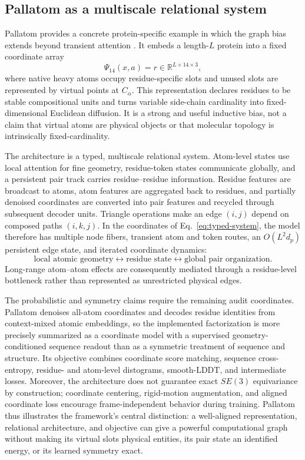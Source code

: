 \documentclass[10pt]{article}
\newcommand{\R}{\mathbb R}
\theoremstyle{definition}
\theoremstyle{remark}
\newcommand{\BookSection}[1]{\subsection{#1}}
\begin{document}
\ifdefined\BOOKMODE
\else
\BookSection{Pallatom as a multiscale relational system}

Pallatom provides a concrete protein-specific example in which the graph bias extends beyond
transient attention \cite{qu2025pallatom}.  It embeds a length-$L$ protein into a fixed coordinate
array
\begin{equation}
\Psi_{14}(x,a)=r\in\R^{L\times14\times3},
\label{eq:pallatom-atom14}
\end{equation}
where native heavy atoms occupy residue-specific slots and unused slots are represented by virtual
points at $C_\alpha$.  This representation declares residues to be stable compositional units and
turns variable side-chain cardinality into fixed-dimensional Euclidean diffusion.  It is a strong
and useful inductive bias, not a claim that virtual atoms are physical objects or that molecular
topology is intrinsically fixed-cardinality.

The architecture is a typed, multiscale relational system.  Atom-level states use local attention
for fine geometry, residue-token states communicate globally, and a persistent pair track carries
residue--residue information.  Residue features are broadcast to atoms, atom features are
aggregated back to residues, and partially denoised coordinates are converted into pair features
and recycled through subsequent decoder units.  Triangle operations make an edge $(i,j)$ depend on
composed paths $(i,k,j)$.  In the coordinates of Eq.~\ref{eq:typed-system}, the model therefore has
multiple node fibers, transient atom and token routes, an $O(L^2d_p)$ persistent edge state, and
iterated coordinate dynamics:
\begin{equation}
\text{local atomic geometry}
\longleftrightarrow
\text{residue state}
\longleftrightarrow
\text{global pair organization}.
\label{eq:pallatom-multiscale-bias}
\end{equation}
Long-range atom--atom effects are consequently mediated through a residue-level bottleneck rather
than represented as unrestricted physical edges.

The probabilistic and symmetry claims require the remaining audit coordinates.  Pallatom denoises
all-atom coordinates and decodes residue identities from context-mixed atomic embeddings, so the
implemented factorization is more precisely summarized as a coordinate model with a supervised
geometry-conditioned sequence readout than as a symmetric treatment of sequence and structure.
Its objective combines coordinate score matching, sequence cross-entropy, residue- and atom-level
distograms, smooth-LDDT, and intermediate losses.  Moreover, the architecture does not guarantee
exact $SE(3)$ equivariance by construction; coordinate centering, rigid-motion augmentation, and
aligned coordinate loss encourage frame-independent behavior during training.  Pallatom thus
illustrates the framework's central distinction: a well-aligned representation, relational
architecture, and objective can give a powerful computational graph without making its virtual
slots physical entities, its pair state an identified energy, or its learned symmetry exact.
\fi
\end{document}
